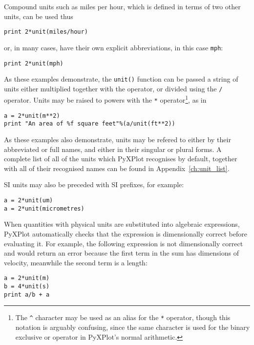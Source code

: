 Compound units such as miles per hour, which is defined in terms of two other
units, can be used thus

\begin{verbatim}
print 2*unit(miles/hour)
\end{verbatim}

\noindent or, in many cases, have their own explicit abbreviations, in this
case {\tt mph}:

\begin{verbatim}
print 2*unit(mph)
\end{verbatim}

\noindent As these examples demonstrate, the {\tt unit()} function can be
passed a string of units either multiplied together with the {\tt *} operator,
or divided using the {\tt /} operator. Units may be raised to powers with the
{\tt **} operator\footnote{The {\tt \^{}} character may be used as an alias for
the {\tt **} operator, though this notation is arguably confusing, since the
same character is used for the binary exclusive or operator in PyXPlot's normal
arithmetic.}, as in

\begin{verbatim}
a = 2*unit(m**2)
print "An area of %f square feet"%(a/unit(ft**2))
\end{verbatim}

\noindent As these examples also demonstrate, units may be refered to either by
their abbreviated or full names, and either in their singular or plural forms.
A complete list of all of the units which PyXPlot recognises by default,
together with all of their recognised names can be found in
Appendix~\ref{ch:unit_list}.

SI units may also be preceded with SI prefixes, for
example:

\begin{verbatim}
a = 2*unit(um)
a = 2*unit(micrometres)
\end{verbatim}

When quantities with physical units are substituted into algebraic expressions,
PyXPlot automatically checks that the expression is dimensionally correct
before evaluating it. For example, the following expression is not
dimensionally correct and would return an error because the first term in the
sum has dimensions of velocity, meanwhile the second term is a length:

\begin{verbatim}
a = 2*unit(m)
b = 4*unit(s)
print a/b + a
\end{verbatim}

